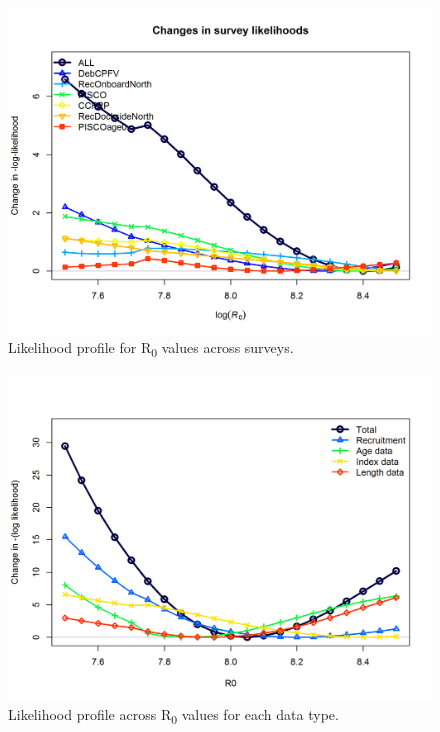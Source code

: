 \documentclass[12pt,]{article}
\begin{document}
\begin{figure}
\centering
\includegraphics{Figures/profile_R0_piner2.png}
\caption{Likelihood profile for R\textsubscript{0} values across
surveys. \label{fig:profile_R0_piner2}}
\end{figure}

\FloatBarrier

\begin{figure}
\centering
\includegraphics{Figures/profile_R0_like.png}
\caption{Likelihood profile across R\textsubscript{0} values for each
data type. \label{fig:profile_R0_like}}
\end{figure}

\FloatBarrier
\end{document}
